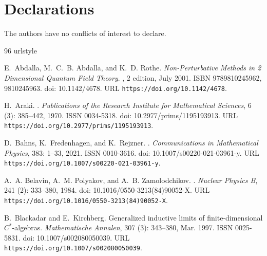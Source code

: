 \documentclass[a4paper, 11pt]{article}
\DeclareMathOperator{\1}{\mathds{1}}
\begin{document}
\section*{Declarations}

The authors have no conflicts of interest to declare.


\begin{thebibliography}{96}
\providecommand{\natexlab}[1]{#1}
\providecommand{\url}[1]{\texttt{#1}}
\expandafter\ifx\csname urlstyle\endcsname\relax
  \providecommand{\doi}[1]{doi: #1}\else
  \providecommand{\doi}{doi: \begingroup \urlstyle{rm}\Url}\fi

E.~Abdalla, M.~C.~B. Abdalla, and K.~D. Rothe.
\newblock \emph{{Non-Perturbative Methods in 2 Dimensional Quantum Field
  Theory}}.
, 2 edition, July 2001.
\newblock ISBN 9789810245962, 9810245963.
\newblock \doi{10.1142/4678}.
\newblock URL \url{https://doi.org/10.1142/4678}.

H.~Araki.
.
\newblock \emph{Publications of the Research Institute for Mathematical
  Sciences}, 6 (3): 385--442, 1970.
\newblock ISSN 0034-5318.
\newblock \doi{10.2977/prims/1195193913}.
\newblock URL \url{https://doi.org/10.2977/prims/1195193913}.

D.~Bahns, K.~Fredenhagen, and K.~Rejzner.
.
\newblock \emph{Communications in Mathematical Physics}, 383: 1--33,
  2021.
\newblock ISSN 0010-3616.
\newblock \doi{10.1007/s00220-021-03961-y}.
\newblock URL \url{https://doi.org/10.1007/s00220-021-03961-y}.

A.~A. Belavin, A.~M. Polyakov, and A.~B. Zamolodchikov.
.
\newblock \emph{Nuclear Physics B}, 241 (2): 333--380, 1984.
\newblock \doi{10.1016/0550-3213(84)90052-X}.
\newblock URL \url{https://doi.org/10.1016/0550-3213(84)90052-X}.

B.~Blackadar and E.~Kirchberg.
\newblock Generalized inductive limits of finite-dimensional {$C^*$}-algebras.
\newblock \emph{Mathematische Annalen}, 307 (3): 343--380,
  Mar. 1997.
\newblock ISSN 0025-5831.
\newblock \doi{10.1007/s002080050039}.
\newblock URL \url{https://doi.org/10.1007/s002080050039}.


\end{thebibliography}
\end{document}
